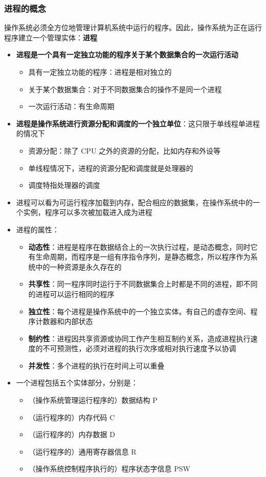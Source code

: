 \documentclass[cs4size,a4paper,10pt]{ctexart}
\begin{document}
	\subsubsection{进程的概念}
	操作系统必须全方位地管理计算机系统中运行的程序。因此，操作系统为正在运行程序建立一个管理实体：\textbf{进程}
	\begin{itemize}
		\item \textbf{进程是一个具有一定独立功能的程序关于某个数据集合的一次运行活动}
		\begin{itemize}
			\item 具有一定独立功能的程序：进程是相对独立的
			\item 关于某个数据集合：对于不同数据集合的操作不是同一个进程
			\item 一次运行活动：有生命周期
		\end{itemize}
		\item \textbf{进程是操作系统进行资源分配和调度的一个独立单位}：这只限于单线程单进程的情况下
		\begin{itemize}
			\item 资源分配：除了 CPU 之外的资源的分配，比如内存和外设等
			\item 单线程情况下，进程的资源分配和调度就是处理器的
			\item 调度特指处理器的调度
		\end{itemize}
		\item 进程可以看为可运行程序加载到内存，配合相应的数据集，在操作系统中的一个实例，程序可以多次被加载进入成为进程
		\item 进程的属性：
		\begin{itemize}
			\item \textbf{动态性}：进程是程序在数据结合上的一次执行过程，是动态概念，同时它有生命周期，而程序是一组有序指令序列，是静态概念，所以程序作为系统中的一种资源是永久存在的
			\item \textbf{共享性}：同一程序同时运行于不同数据集合上时都是不同的进程，即不同的进程可以运行相同的程序
			\item \textbf{独立性}：每个进程是操作系统中的一个独立实体。有自己的虚存空间、程序计数器和内部状态
			\item \textbf{制约性}：进程因共享资源或协同工作产生相互制约关系，造成进程执行速度的不可预测性，必须对进程的执行次序或相对执行速度予以协调
			\item \textbf{并发性}：多个进程的执行在时间上可以重叠
		\end{itemize}
		\item 一个进程包括五个实体部分，分别是：
		\begin{itemize}
			\item （操作系统管理运行程序的）数据结构 P
			\item （运行程序的）内存代码 C
			\item （运行程序的）内存数据 D
			\item （运行程序的）通用寄存器信息 R
			\item （操作系统控制程序执行的）程序状态字信息 PSW
		\end{itemize}
	\end{itemize}
\end{document}
